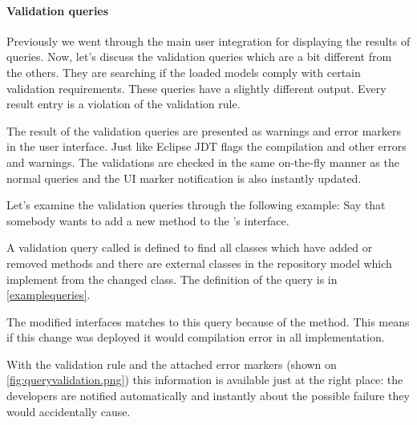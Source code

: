 \paragraph{Validation queries}	
Previously we went through the main user integration for displaying the results
of queries. Now, let’s discuss the validation queries which are a bit different
from the others. They are searching if the loaded models comply with certain
validation requirements. These queries have a slightly different output. Every
result entry is a violation of the validation rule.

The result of the validation queries are presented as warnings and error
markers in the user interface. Just like Eclipse JDT flags the compilation and
other errors and warnings. The validations are checked in the same on-the-fly
manner as the normal queries and the UI marker notification is also instantly
updated.

Let's examine the validation queries through the following example: Say that
somebody wants to add a new  method to the 's
 interface. 

A validation query called  is defined to
find all classes which have added or removed methods and there are
external classes in the repository model which implement from the changed
class. The definition of the query is in \autoref {examplequeries}.

The modified  interfaces matches to this query because of the
 method. This means if this change was deployed it would
compilation error in all implementation. 

With the validation rule and the attached error markers (shown on
\autoref{fig:queryvalidation.png}) this information is available just at
the right place: the developers are notified automatically and instantly
about the possible failure they would accidentally cause.



 